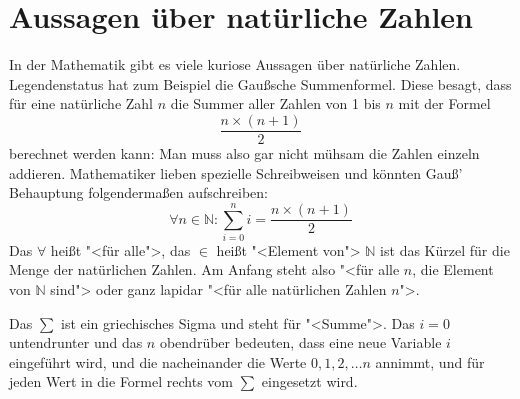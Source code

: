 



\section{Aussagen über natürliche Zahlen}
\label{sec:mathematical-induction}
\label{sec:gausssche-summenformel}

In der Mathematik gibt es viele kuriose Aussagen über natürliche
Zahlen.  Legendenstatus hat zum Beispiel die Gaußsche
Summenformel.  Diese besagt, dass für
eine natürliche Zahl $n$ die Summer aller Zahlen von 1 bis $n$ mit der
Formel
\[\frac{n\times (n+1)}{2}\]
berechnet werden kann: Man muss also gar nicht mühsam die Zahlen
einzeln addieren.  Mathematiker lieben spezielle Schreibweisen und
könnten Gauß' Behauptung folgendermaßen aufschreiben:
%
\[\forall n\in\mathbb{N}: \sum_{i=0}^n i =
  \frac{n\times (n+1)}{2}\]
%
Das $\forall$ heißt "<für alle">, das $\in$ heißt "<Element von">
$\mathbb{N}$ ist das Kürzel für die Menge der natürlichen Zahlen.
Am Anfang steht also "<für alle $n$, die Element von $\mathbb{N}$
sind"> oder ganz lapidar "<für alle natürlichen Zahlen $n$">.

Das $\sum$ ist ein griechisches Sigma und steht für "<Summe">.  Das
$i=0$ untendrunter und das $n$ obendrüber bedeuten, dass eine neue
Variable $i$ eingeführt wird, und die nacheinander die Werte $0, 1, 2,
\ldots n$ annimmt, und für jeden Wert in die Formel rechts vom $\sum$
eingesetzt wird.

